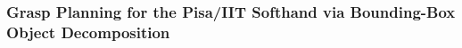 
\subsubsection{Grasp Planning for the Pisa/IIT Softhand via Bounding-Box Object Decomposition} 
\label{sec:GraspPlanningBoundingBoxes} 